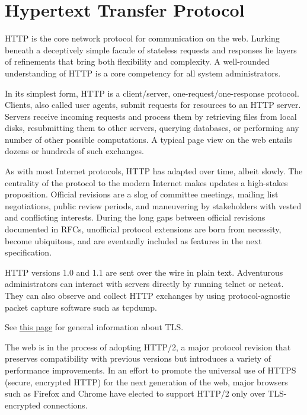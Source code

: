 \chapter{Hypertext Transfer Protocol}
\label{chap:http}

HTTP is the core network protocol for communication on the web. Lurking
beneath a deceptively simple facade of stateless requests and responses
lie layers of refinements that bring both flexibility and complexity. A
well-rounded understanding of HTTP is a core competency for all system
administrators.

In its simplest form, HTTP is a client/server, one-request/one-response
protocol. Clients, also called user agents, submit requests for
resources to an HTTP server. Servers receive incoming requests and
process them by retrieving files from local disks, resubmitting them to
other servers, querying databases, or performing any number of other
possible computations. A typical page view on the web entails dozens or
hundreds of such exchanges.

As with most Internet protocols, HTTP has adapted over time, albeit
slowly. The centrality of the protocol to the modern Internet makes
updates a high-stakes proposition. Official revisions are a slog of
committee meetings, mailing list negotiations, public review periods,
and maneuvering by stakeholders with vested and conflicting interests.
During the long gaps between official revisions documented in RFCs,
unofficial protocol extensions are born from necessity, become
ubiquitous, and are eventually included as features in the next
specification.

\protect\hypertarget{part0027_split_001.htmlux5cux23_idIndexMarker2745}{}{}HTTP
versions 1.0 and 1.1 are sent over the wire in plain text. Adventurous
administrators can interact with servers directly by running {telnet} or
\protect\hypertarget{part0027_split_001.htmlux5cux23_idIndexMarker2746}{}{}{netcat}.
They can also observe and collect HTTP exchanges by using
protocol-agnostic packet capture software such as
\protect\hypertarget{part0027_split_001.htmlux5cux23_idIndexMarker2747}{}{}{tcpdump}.

\leavevmode\hypertarget{part0027_split_001.htmlux5cux23_idContainer1250}{}%
See
\protect\hyperlink{part0037_split_040.htmlux5cux23_idTextAnchor1727}{this
page} for general information about TLS.

The web is in the process of adopting HTTP/2, a major protocol revision
that preserves compatibility with previous versions but introduces a
variety of performance improvements. In an effort to promote the
universal use of HTTPS (secure, encrypted HTTP) for the next generation
of the web, major browsers such as Firefox and Chrome have elected to
support HTTP/2 only over TLS-encrypted connections.

